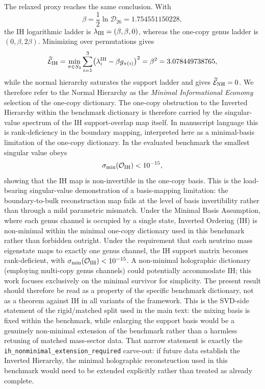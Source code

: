 \documentclass[11pt]{article}
\begin{document}
The relaxed proxy reaches the same conclusion. With
\begin{equation}
 \beta = \frac12\ln\mathcal D_{26}=1.754551150228,
\end{equation}
the IH logarithmic ladder is $\lambda_{\rm IH}=(\beta,\beta,0)$, whereas the one-copy genus ladder is $(0,\beta,2\beta)$. Minimizing over permutations gives
\begin{equation}
 \widetilde{\mathcal E}_{\rm IH}
 =
 \min_{\pi\in S_3}
 \sum_{i=1}^3\bigl(\lambda_i^{\rm IH}-\beta g_{\pi(i)}\bigr)^2
 = \beta^2
 = 3.078449738765,
\end{equation}
while the normal hierarchy saturates the support ladder and gives $\widetilde{\mathcal E}_{\rm NH}=0$. We therefore refer to the Normal Hierarchy as the \emph{Minimal Informational Economy} selection of the one-copy dictionary. The one-copy obstruction to the Inverted Hierarchy within the benchmark dictionary is therefore carried by the singular-value spectrum of the IH support-overlap map itself. In manuscript language this is rank-deficiency in the boundary mapping, interpreted here as a minimal-basis limitation of the one-copy dictionary. In the evaluated benchmark the smallest singular value obeys
\begin{equation}
 \sigma_{\min}(\mathcal O_{\rm IH})<10^{-15},
\end{equation}
showing that the IH map is non-invertible in the one-copy basis. This is the load-bearing singular-value demonstration of a basis-mapping limitation: the boundary-to-bulk reconstruction map fails at the level of basis invertibility rather than through a mild parametric mismatch. Under the Minimal Basis Assumption, where each genus channel is occupied by a single state, Inverted Ordering (IH) is non-minimal within the minimal one-copy dictionary used in this benchmark rather than forbidden outright. Under the requirement that each neutrino mass eigenstate maps to exactly one genus channel, the IH support matrix becomes rank-deficient, with $\sigma_{\min}(\mathcal O_{\rm IH})<10^{-15}$. A non-minimal holographic dictionary (employing multi-copy genus channels) could potentially accommodate IH; this work focuses exclusively on the minimal survivor for simplicity. The present result should therefore be read as a property of the specific benchmark dictionary, not as a theorem against IH in all variants of the framework. This is the SVD-side statement of the rigid/matched split used in the main text: the mixing basis is fixed within the benchmark, while enlarging the support basis would be a genuinely non-minimal extension of the benchmark rather than a harmless retuning of matched mass-sector data. That narrow statement is exactly the \texttt{ih\_nonminimal\_extension\_required} carve-out: if future data establish the Inverted Hierarchy, the minimal holographic reconstruction used in this benchmark would need to be extended explicitly rather than treated as already complete.
\end{document}
